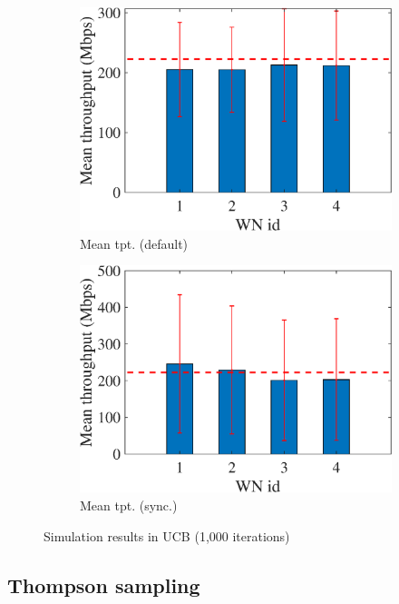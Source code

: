 \documentclass[preprint,12pt]{article}
\begin{document}
\begin{figure}[h!]
	\begin{subfigure}[b]{.33\textwidth}
		\includegraphics[width=\textwidth]{images/mean_tpt_UCB}
		\caption{Mean tpt. (default)}\label{fig:mean_tpt_UCB}
	\end{subfigure}
	\begin{subfigure}[b]{.33\textwidth}
		\includegraphics[width=\textwidth]{images/mean_tpt_OUCB}
		\caption{Mean tpt. (sync.)}\label{fig:mean_tpt_OUCB}
	\end{subfigure}
	\caption{Simulation results in UCB (1,000 iterations)}
	\label{fig:ucb}
\end{figure}

\subsection{Thompson sampling}
\label{section:ts}
\end{document}
